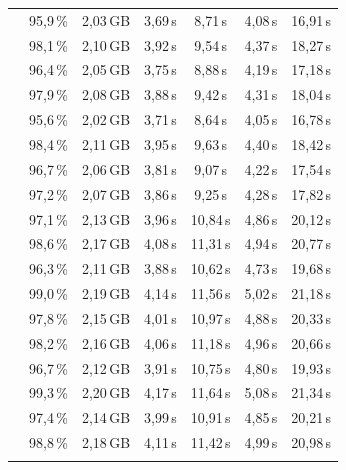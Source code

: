 \begin{table}[H]
\begin{tabularx}{\textwidth}{C C C C C C C}
                       & 95{,}9\,\% & 2{,}03\,GB & 3{,}69\,s & 8{,}71\,s  & 4{,}08\,s & 16{,}91\,s \\
                       & 98{,}1\,\% & 2{,}10\,GB & 3{,}92\,s & 9{,}54\,s  & 4{,}37\,s & 18{,}27\,s \\
                       & 96{,}4\,\% & 2{,}05\,GB & 3{,}75\,s & 8{,}88\,s  & 4{,}19\,s & 17{,}18\,s \\
                       & 97{,}9\,\% & 2{,}08\,GB & 3{,}88\,s & 9{,}42\,s  & 4{,}31\,s & 18{,}04\,s \\
                       & 95{,}6\,\% & 2{,}02\,GB & 3{,}71\,s & 8{,}64\,s  & 4{,}05\,s & 16{,}78\,s \\
                       & 98{,}4\,\% & 2{,}11\,GB & 3{,}95\,s & 9{,}63\,s  & 4{,}40\,s & 18{,}42\,s \\
                       & 96{,}7\,\% & 2{,}06\,GB & 3{,}81\,s & 9{,}07\,s  & 4{,}22\,s & 17{,}54\,s \\
                       & 97{,}2\,\% & 2{,}07\,GB & 3{,}86\,s & 9{,}25\,s  & 4{,}28\,s & 17{,}82\,s \\
    \addlinespace[2pt]
                      & 97{,}1\,\% & 2{,}13\,GB & 3{,}96\,s & 10{,}84\,s & 4{,}86\,s & 20{,}12\,s \\
                       & 98{,}6\,\% & 2{,}17\,GB & 4{,}08\,s & 11{,}31\,s & 4{,}94\,s & 20{,}77\,s \\
                       & 96{,}3\,\% & 2{,}11\,GB & 3{,}88\,s & 10{,}62\,s & 4{,}73\,s & 19{,}68\,s \\
                       & 99{,}0\,\% & 2{,}19\,GB & 4{,}14\,s & 11{,}56\,s & 5{,}02\,s & 21{,}18\,s \\
                       & 97{,}8\,\% & 2{,}15\,GB & 4{,}01\,s & 10{,}97\,s & 4{,}88\,s & 20{,}33\,s \\
                       & 98{,}2\,\% & 2{,}16\,GB & 4{,}06\,s & 11{,}18\,s & 4{,}96\,s & 20{,}66\,s \\
                       & 96{,}7\,\% & 2{,}12\,GB & 3{,}91\,s & 10{,}75\,s & 4{,}80\,s & 19{,}93\,s \\
                       & 99{,}3\,\% & 2{,}20\,GB & 4{,}17\,s & 11{,}64\,s & 5{,}08\,s & 21{,}34\,s \\
                       & 97{,}4\,\% & 2{,}14\,GB & 3{,}99\,s & 10{,}91\,s & 4{,}85\,s & 20{,}21\,s \\
                       & 98{,}8\,\% & 2{,}18\,GB & 4{,}11\,s & 11{,}42\,s & 4{,}99\,s & 20{,}98\,s \\
    \addlinespace[2pt]

\end{tabularx}
\end{table}
